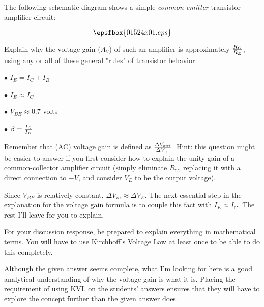 

The following schematic diagram shows a simple {\it common-emitter} transistor amplifier circuit:

$$\epsfbox{01524x01.eps}$$

Explain why the voltage gain ($A_V$) of such an amplifier is approximately ${R_C \over R_E}$, using any or all of these general "rules" of transistor behavior:

\medskip
\item{$\bullet$} $I_E = I_C + I_B$
\item{$\bullet$} $I_E \approx I_C$
\item{$\bullet$} $V_{BE} \approx 0.7$ volts
\item{$\bullet$} $\beta = {I_C \over I_B}$
\medskip

Remember that (AC) voltage gain is defined as ${\Delta V_{out} \over \Delta V_{in}}$.  Hint: this question might be easier to answer if you first consider how to explain the unity-gain of a common-collector amplifier circuit (simply eliminate $R_C$, replacing it with a direct connection to $-V$, and consider $V_E$ to be the output voltage).







Since $V_{BE}$ is relatively constant, $\Delta V_{in} \approx \Delta V_E$.  The next essential step in the explanation for the voltage gain formula is to couple this fact with $I_E \approx I_C$.  The rest I'll leave for you to explain.
 
\vskip 10pt

For your discussion response, be prepared to explain everything in mathematical terms.  You will have to use Kirchhoff's Voltage Law at least once to be able to do this completely.







Although the given answer seems complete, what I'm looking for here is a good analytical understanding of why the voltage gain is what it is.  Placing the requirement of using KVL on the students' answers ensures that they will have to explore the concept further than the given answer does.




